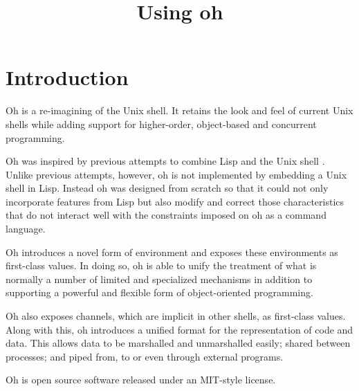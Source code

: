 \documentclass[12pt]{book}
\begin{document}
\title{\Huge \bf Using oh}
\author{}
\date{}

\maketitle

\chapter{Introduction}
Oh is a re-imagining of the Unix shell. It retains the look and feel of
current Unix shells while adding support for higher-order, object-based and
concurrent programming.

Oh was inspired by previous attempts to combine Lisp and the Unix shell
\cite{ALispShell, scsh}. Unlike previous attempts, however, oh is not
implemented by embedding a Unix shell in Lisp. Instead oh was designed
from scratch so that it could not only incorporate features from Lisp but
also modify and correct those characteristics that do not interact well
with the constraints imposed on oh as a command language.

Oh introduces a novel form of environment and exposes these environments
as first-class values. In doing so, oh is able to unify the treatment of
what is normally a number of limited and specialized mechanisms in addition
to supporting a powerful and flexible form of object-oriented programming.

Oh also exposes channels, which are implicit in other shells, as first-class
values. Along with this, oh introduces a unified format for the
representation of code and data. This allows data to be marshalled and
unmarshalled easily; shared between processes; and piped from, to or even
through external programs.

Oh is open source software released under an MIT-style license.


\end{document}
